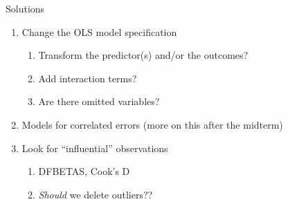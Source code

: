 \documentclass[
  ignorenonframetext,
]{beamer}
\providecommand{\tightlist}{%
  \setlength{\itemsep}{0pt}\setlength{\parskip}{0pt}}
\newcommand{\setsep}{\setlength{\itemsep}{3pt}}
\newcommand{\setskip}{\setlength{\parskip}{3pt}}
\renewcommand{\tightlist}{\setsep\setskip}
\begin{document}
\begin{frame}{Solutions}
\protect\hypertarget{solutions}{}
\pause

\begin{enumerate}[<+->]
\tightlist
\item
  Change the OLS model specification

  \begin{enumerate}[<+->]
  [a.]
  \tightlist
  \item
    Transform the predictor(s) and/or the outcomes?
  \item
    Add interaction terms?
  \item
    Are there omitted variables?
  \end{enumerate}
\item
  Models for correlated errors (more on this after the midterm)
\item
  Look for ``influential'' observations

  \begin{enumerate}[<+->]
  [a.]
  \tightlist
  \item
    DFBETAS, Cook's D
  \item
    \emph{Should} we delete outliers??
  \end{enumerate}
\end{enumerate}
\end{frame}
\end{document}
